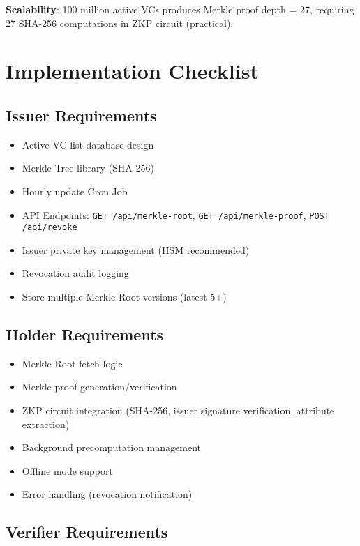 \textbf{Scalability}: 100 million active VCs produces Merkle proof depth = 27, requiring 27 SHA-256 computations in ZKP circuit (practical).

\section{Implementation Checklist}

\subsection{Issuer Requirements}

\begin{itemize}
  \item Active VC list database design
  \item Merkle Tree library (SHA-256)
  \item Hourly update Cron Job
  \item API Endpoints: \texttt{GET /api/merkle-root}, \texttt{GET /api/merkle-proof}, \texttt{POST /api/revoke}
  \item Issuer private key management (HSM recommended)
  \item Revocation audit logging
  \item Store multiple Merkle Root versions (latest 5+)
\end{itemize}

\subsection{Holder Requirements}

\begin{itemize}
  \item Merkle Root fetch logic
  \item Merkle proof generation/verification
  \item ZKP circuit integration (SHA-256, issuer signature verification, attribute extraction)
  \item Background precomputation management
  \item Offline mode support
  \item Error handling (revocation notification)
\end{itemize}

\subsection{Verifier Requirements}

